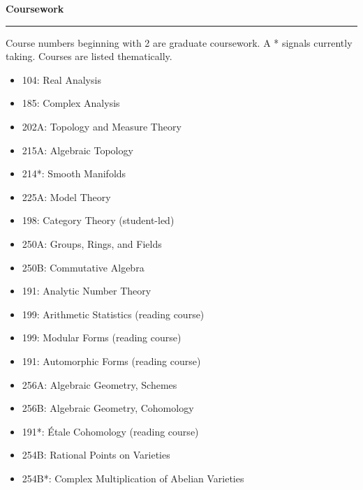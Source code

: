 \documentclass{article}
\renewcommand{\section}[1]{{\color{headercolor}\LARGE
    \textbf{#1\phantom{p}}\hrule}}
\newcommand{\award}[3]{{\large\textbf{#1}}\hfill\textit{#2}\\
    \textcolor{gray}{#3}}
\begin{document}
\iffalse
    \award{Texas A\&M University High School Contest}{Oct. 2018}
    {State contest. Placed 5th in Best Student Closed exam, 10th in EF exam.}
\fi


\iffalse
    \award{TLU Bulldog Calculus Showdown}{Mar. 2018, 2019}
    {State contest. Led team to place 1st consecutively for the final round.}
\fi

\iffalse
    \award{National AP Scholar}{2020}
    {Scored 4 or higher on eight total AP exams.}
\fi

\section{Coursework}
Course numbers beginning with 2 are graduate coursework. A * signals currently taking. Courses are listed thematically.
\begin{multicols}{2}
    \begin{itemize}
        \item 104: Real Analysis
        \item 185: Complex Analysis
        \item 202A: Topology and Measure Theory
        \item 215A: Algebraic Topology
        \item 214*: Smooth Manifolds
        \item 225A: Model Theory
        \item 198: Category Theory (student-led)
        \item 250A: Groups, Rings, and Fields
        \item 250B: Commutative Algebra
        \item 191: Analytic Number Theory
        \item 199: Arithmetic Statistics (reading course)
        \item 199: Modular Forms (reading course)
        \item 191: Automorphic Forms (reading course)
        \item 256A: Algebraic Geometry, Schemes
        \item 256B: Algebraic Geometry, Cohomology
        \item 191*: \'Etale Cohomology (reading course)
        \item 254B: Rational Points on Varieties
        \item 254B*: Complex Multiplication of Abelian Varieties
    \end{itemize}
\end{multicols}
\end{document}
